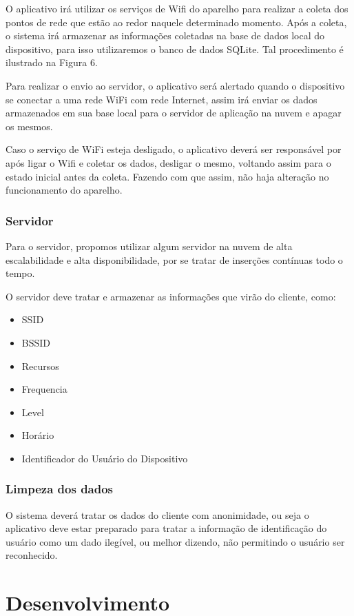 \documentclass[12pt, %
openright, 
oneside,
a4paper,
brazil]{facom-ufu-abntex2}
\begin{document}
O aplicativo irá utilizar os serviços de Wifi do aparelho para realizar a coleta dos pontos de rede que estão ao redor naquele determinado momento. Após a coleta, o sistema irá armazenar as informações coletadas na base de dados local do dispositivo, para isso utilizaremos o banco de dados SQLite. Tal procedimento é ilustrado na Figura 6.

Para realizar o envio ao servidor, o aplicativo será alertado quando o dispositivo se conectar a uma rede WiFi com rede Internet, assim irá enviar os dados armazenados em sua base local para o servidor de aplicação na nuvem e apagar os mesmos. 

Caso o serviço de WiFi esteja desligado, o aplicativo deverá ser responsável por após ligar o Wifi e coletar os dados, desligar o mesmo, voltando assim para o estado inicial antes da coleta. Fazendo com que assim, não haja alteração no funcionamento do aparelho.




\subsection{Servidor}
Para o servidor, propomos utilizar algum servidor na nuvem de alta escalabilidade e alta disponibilidade, por se tratar de inserções contínuas todo o tempo.

O servidor deve tratar e  armazenar as informações que virão do cliente, como:
\begin{itemize}
  \item SSID
  \item BSSID
  \item Recursos
  \item Frequencia
  \item Level
  \item Horário
  \item Identificador do Usuário do Dispositivo
  \end{itemize}
  
\subsection{Limpeza dos dados}
O sistema deverá tratar os dados do cliente com anonimidade, ou seja o aplicativo deve estar preparado para tratar a informação de identificação do usuário como um dado ilegível, ou melhor dizendo, não permitindo o usuário ser reconhecido. 

\chapter{Desenvolvimento}
\end{document}

